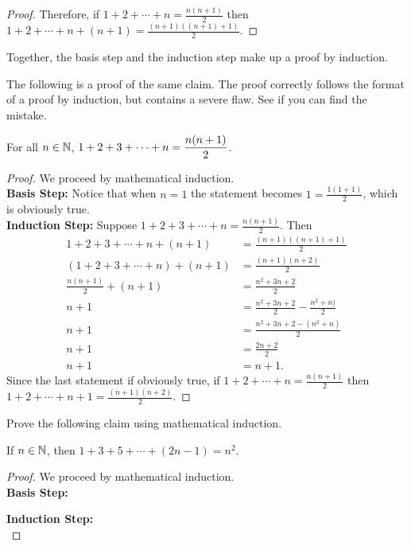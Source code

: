 \begin{question}
\begin{qpart}
\begin{proof}
Therefore, if $1+2+\cdots+n = \frac{n(n+1)}{2}$ then $1+2+\cdots + n + (n+1) = \frac{(n+1)((n+1)+1)}{2}$.
\end{proof}
\item Together, the basis step and the induction step make up a proof by induction.
\end{qpart}
\item The following is a proof of the same claim.  The proof correctly follows the format of a proof by induction, but contains a severe flaw.  See if you can find the mistake.
\begin{claim} 
For all $n\in \mathbb{N}$, $\displaystyle 1+2+3+\cdots+n = \frac{n(n+1)}{2}$.
\end{claim}
\begin{proof}  We proceed by mathematical induction.\\
\noindent \textbf{Basis Step:} Notice that when $n=1$ the statement becomes $1= \frac{1(1+1)}{2}$, which is obviously true.\\

\noindent \textbf{Induction Step:}  Suppose $1+2+3+\cdots+n = \frac{n(n+1)}{2}$.  Then
\begin{align*}
1+2+3+\cdots + n + (n+1) &= \frac{(n+1)((n+1)+1)}{2} \\
(1+2+3+\cdots + n) + (n+1) &=  \frac{(n+1)(n+2)}{2}\\
\frac{n(n+1)}{2} + (n+1) &= \frac{n^2+3n+2}{2}\\
n+1 &= \frac{n^2+3n+2}{2}-\frac{n^2+n)}{2} \\
n+1 &= \frac{n^2+3n+2-(n^2+n)}{2}\\
n+1 &= \frac{2n+2}{2}\\
n+1 &= n+1.
\end{align*}
Since the last statement if obviously true, if $1+2+\cdots+n = \frac{n(n+1)}{2}$ then $1+2+\cdots+n+1 = \frac{(n+1)(n+2)}{2}$.
\end{proof}

\newpage
\item Prove the following claim using mathematical induction.
\begin{claim} If $n \in \mathbb{N}$, then $1+3+5 + \cdots + (2n-1) = n^2.$
\end{claim}

\begin{proof}  We proceed by mathematical induction.\\
\noindent \textbf{Basis Step:}\\
\vspace{1in}

\noindent \textbf{Induction Step:}
\vspace{5.5in}\\
\end{proof}
\end{question}





